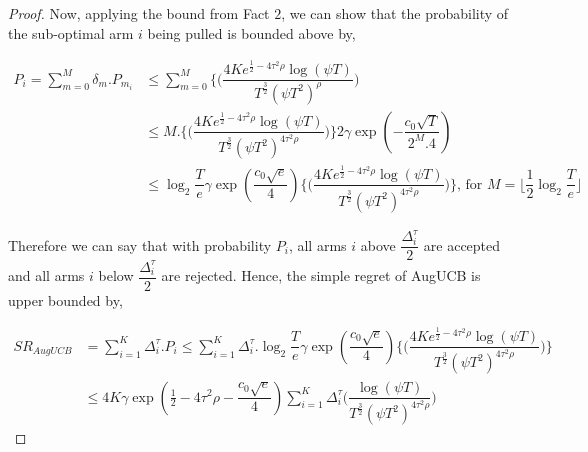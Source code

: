 \begin{proof}
Now, applying the bound from Fact $2$, we can show that the probability of the sub-optimal arm $i$ being pulled is bounded above by,

\begin{align*}
P_{i} = \sum_{m=0}^{M} \delta_{m}.P_{m_{i}} &\leq \sum_{m=0}^{M} \bigg\lbrace\bigg(\dfrac{4Ke^{\frac{1}{2}-4\tau^{2}\rho}\log (\psi T )}{T^{\frac{3}{2}}(\psi T^2)^{\rho}}\bigg)\\
& \leq M.\bigg\lbrace\bigg(\dfrac{4Ke^{\frac{1}{2}-4\tau^{2}\rho}\log (\psi T )}{T^{\frac{3}{2}}(\psi T^2)^{4\tau^{2}\rho}}\bigg)\bigg\rbrace 2\gamma \exp(-\dfrac{c_{0}\sqrt{T}}{2^{M}.4})\\
& \leq \log_{2}\dfrac{T}{e}\gamma \exp(\dfrac{c_{0}\sqrt{e}}{4})\bigg\lbrace\bigg(\dfrac{4Ke^{\frac{1}{2}-4\tau^{2}\rho}\log (\psi T )}{T^{\frac{3}{2}}(\psi T^2)^{4\tau^{2}\rho}}\bigg)\bigg\rbrace \text{, for $M=\big \lfloor \dfrac{1}{2}\log_{2} \dfrac{T}{e}\big\rfloor$}
\end{align*}

Therefore we can say that with probability $P_{i}$, all arms $i$ above $\dfrac{\Delta_{i}^{\tau}}{2}$ are accepted and all arms $i$ below $\dfrac{\Delta_{i}^{\tau}}{2}$ are rejected. Hence, the simple regret of AugUCB is upper bounded by,

\begin{align*}
SR_{AugUCB} &= \sum_{i=1}^{K} \Delta_{i}^{\tau}. P_{i} \leq \sum_{i=1}^{K} \Delta_{i}^{\tau}. \log_{2}\dfrac{T}{e}\gamma \exp(\dfrac{c_{0}\sqrt{e}}{4})\bigg\lbrace\bigg(\dfrac{4Ke^{\frac{1}{2}-4\tau^{2}\rho}\log (\psi T )}{T^{\frac{3}{2}}(\psi T^2)^{4\tau^{2}\rho}}\bigg) \bigg\rbrace \\
&\leq 4K \gamma \exp(\frac{1}{2}- 4\tau^{2}\rho -\dfrac{c_{0}\sqrt{e}}{4}) \sum_{i=1}^{K} \Delta_{i}^{\tau} \bigg(\dfrac{\log (\psi T )}{T^{\frac{3}{2}}(\psi T^2)^{4\tau^{2}\rho}}\bigg) 
\end{align*}


\end{proof}
